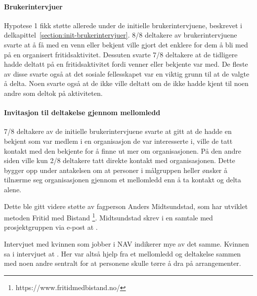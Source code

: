 \paragraph{Brukerintervjuer}
Hypotese 1 fikk støtte allerede under de initielle brukerintervjuene, beskrevet i delkapittel~\ref{section:init-brukerintervjuer}. 8/8 deltakere av brukerintervjuene svarte at å få med en venn eller bekjent ville gjort det enklere for dem å bli med på en organisert fritidsaktivitet. Dessuten svarte 7/8 deltakere at de tidligere hadde deltatt på en fritidsaktivitet fordi venner eller bekjente var med. De fleste av disse svarte også at det sosiale fellesskapet var en viktig grunn til at de valgte å delta. Noen svarte også at de ikke ville deltatt om de ikke hadde kjent til noen andre som deltok på aktiviteten.

\paragraph{Invitasjon til deltakelse gjennom mellomledd}
7/8 deltakere av de initielle brukerintervjuene svarte at gitt at de hadde en bekjent som var medlem i en organisasjon de var interesserte i, ville de tatt kontakt med den bekjente for å finne ut mer om organisasjonen. På den andre siden ville kun 2/8 deltakere tatt direkte kontakt med organisasjonen. Dette bygger opp under antakelsen om at personer i målgruppen heller ønsker å tilnærme seg organisasjonen gjennom et mellomledd enn å ta kontakt og delta alene. 

Dette ble gitt videre støtte av fagperson Anders Midtsundstad, som har utviklet metoden Fritid med Bistand \footnote{https://www.fritidmedbistand.no/}. Midtsundstad skrev i en samtale med prosjektgruppen via e-post at  \cite{MIDTSUNDSTAD-EPOST:14}. 

Intervjuet med kvinnen som jobber i NAV indikerer mye av det samme. Kvinnen sa i intervjuet at  \cite{NAV-INTERVJU:16}. Her var altså hjelp fra et mellomledd og deltakelse sammen med noen andre sentralt for at personene skulle tørre å dra på arrangementer. 

